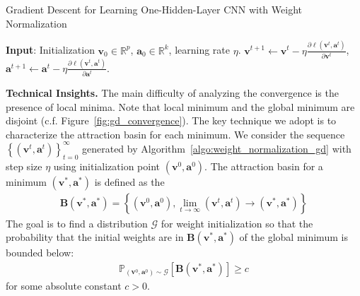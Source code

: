 \documentclass{article}
\newcommand{\firstlayerWN}{v}
\newcommand{\secondlayer}{a}
\newcommand{\vect}[1]{\mathbf{#1}}
\newcommand{\prob}{\mathbb{P}}
\newcommand{\ab}{\mathbf{B}}
\begin{document}
\begin{algorithm}[tb]
	\caption{Gradient Descent for Learning One-Hidden-Layer CNN with Weight Normalization}
    \label{algo:weight_normalization_gd}
	\begin{algorithmic}[1]
		\STATE \textbf{Input}: Initialization $\vect{v}_0\in\mathbb{R}^p$, $\vect{\secondlayer}_0 \in \mathbb{R}^{k}$, learning rate $\eta$.
		\STATE $\vect{\firstlayerWN}^{t+1}\leftarrow \vect{\firstlayerWN}^t - \eta\frac{\partial \ell\left(\vect{\firstlayerWN}^t,\vect{\secondlayer}^t\right)}{\partial \vect{\firstlayerWN}^t}$,
		\STATE $\vect{\secondlayer}^{t+1} \leftarrow \vect{\secondlayer}^t - \eta\frac{\partial \ell\left(\vect{\firstlayerWN}^{t},\vect{\secondlayer}^t\right)}{\partial \vect{\secondlayer}^t}$.
		\ENDFOR     
	\end{algorithmic}
\end{algorithm}\textbf{Technical Insights.}\label{sec:technique}
The main difficulty of analyzing the convergence is the presence of local minima.
Note that local minimum and the global minimum are disjoint (c.f. Figure~\ref{fig:gd_convergence}).
The key technique we adopt is to characterize the attraction basin for each minimum.
We consider the sequence $\left\{\left(\vect{\firstlayerWN}^t,\vect{\secondlayer}^t\right)\right\}_{t=0}^{\infty}$ generated by Algorithm~\ref{algo:weight_normalization_gd} with step size $\eta$ using initialization point $\left(\vect{\firstlayerWN}^0,\vect{\secondlayer}^0\right)$.
The attraction basin for a minimum $\left(\vect{\firstlayerWN}^*,\vect{\secondlayer}^*\right)$ is defined as the \begin{align*}
	\ab\left(\vect{\firstlayerWN}^*,\vect{\secondlayer}^*\right) = \left\{\left(\vect{\firstlayerWN}^0,\vect{\secondlayer}^0\right), \lim\limits_{t\rightarrow \infty}\left(\vect{\firstlayerWN}^t,\vect{\secondlayer}^t\right) \rightarrow \left(\vect{\firstlayerWN}^*,\vect{\secondlayer}^*\right)\right\}
\end{align*}
The goal is to find a distribution $\mathcal{G}$ for weight initialization so that the probability that the initial weights are in $\ab\left(\vect{\firstlayerWN}^*,\vect{\secondlayer}^*\right)$ of the global minimum is bounded below: 
\begin{align*}
	\prob_{\left(\vect{\firstlayerWN}^0, \vect{\secondlayer}^0\right)\sim \mathcal{G}}\left[\ab\left(\vect{\firstlayerWN}^*,\vect{\secondlayer}^*\right)\right] \ge c
\end{align*} for some absolute constant $c > 0$.
\end{document}
